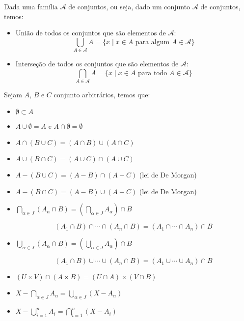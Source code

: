  Dada uma família $\mathcal{A}$ de conjuntos, ou seja, dado um conjunto $\mathcal{A}$ de conjuntos, temos:
 \begin{itemize}
 \item União de todos os conjuntos que são elementos de $\mathcal{A}$:
\begin{equation}
\bigcup_{A \in \mathcal{A}} A = \{x\mid x \in A \text{ para algum } A \in \mathcal{A}\}
\end{equation}
 \item Interseção de todos os conjuntos que são elementos de $\mathcal{A}$:
\begin{equation}
\bigcap_{A \in \mathcal{A}} A = \{x\mid x \in A \text{ para todo } A \in \mathcal{A}\}
\end{equation}
\end{itemize}

\begin{prop}
Sejam $A$, $B$ e $C$ conjunto arbitrários, temos que:
\begin{itemize}
 \item $\emptyset \subset A$
 \item $A \cup \emptyset= A$ e $A \cap \emptyset= \emptyset$
 \item $A \cap (B \cup C) = (A \cap B) \cup (A \cap C)$
 \item $A \cup (B \cap C) = (A \cup C) \cap (A \cup C)$
 \item $A - (B \cup C) = (A - B) \cap (A - C)$ (lei de De Morgan)
 \item $A - (B \cap C) = (A - B) \cup (A - C)$ (lei de De Morgan)
 \item $\bigcap_{\alpha \in J}(A_{\alpha} \cap B) = (\bigcap_{\alpha \in J} A_{\alpha}) \cap B$

\begin{equation}
(A_1 \cap B) \cap \cdots \cap (A_n \cap B) = (A_1 \cap \cdots \cap A_n) \cap B
\end{equation}

 \item $\bigcup_{\alpha \in J}(A_{\alpha} \cap B) = (\bigcup_{\alpha \in J} A_{\alpha}) \cap B$

\begin{equation}
(A_1 \cap B) \cup \cdots \cup (A_n \cap B) = (A_1 \cup \cdots \cup A_n) \cap B
\end{equation}

 \item $(U \times V) \cap (A \times B) = (U \cap A) \times (V \cap B)$

 \item $X - \bigcap_{\alpha \in J} A_{\alpha} = \bigcup_{\alpha \in J}(X - A_{\alpha})$

 \item $X - \bigcup_{i= 1}^{n} A_i = \bigcap_{i = 1}^{n}(X - A_i)$

\end{itemize}
\end{prop}

